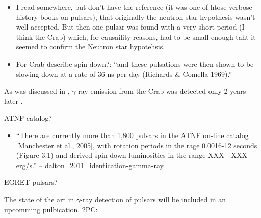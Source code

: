 \begin{itemize}
  \item I read somewhere, but don't have the reference (it was one
    of htose verbose history books on pulsars), that originally
    the neutron star hypothesis wasn't well accepted. But then
    one pulsar was found with a very short period (I think the Crab)
    which, for causaility reasons, had to be small enough taht it
    seemed to confirm the Neutron star hypotehsis.
  \item For Crab describe spin down?: ``and these pulsations were then shown to be slowing down at a
    rate of 36 ns per day (Richards \& Comella 1969).'' -- \cite{gaensler_2006_evolution-structure}
\end{itemize}

As was discussed in ,
$\gamma$-ray emission from the Crab was detected only 2 years
later \citep{browning_1971_detection-pulsed}.


ATNF catalog?

\begin{itemize}
  \item ``There are currently more than 1,800 pulsars in the ATNF on-line
  catalog [Manchester et al., 2005], with rotation periods in the rage
  0.0016-12 seconds (Figure 3.1) and derived spin down
  luminosities in the range XXX - XXX erg/s.'' -- dalton\_2011\_identication-gamma-ray
\end{itemize}

EGRET pulsars?

The state of the art in $\gamma$-ray detection of pulsars
will be included in an upcomming pulbication.
2PC: 



\subsection{}




